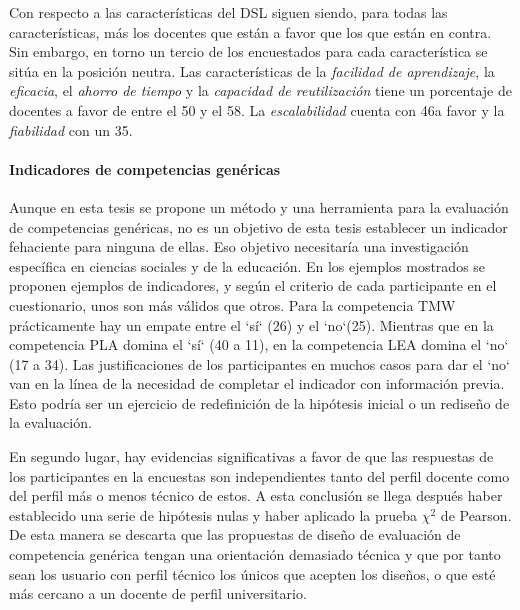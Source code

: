 Con respecto a las características del DSL siguen siendo, para todas las características, más los docentes que están a favor que los que están en contra. Sin embargo, en torno un tercio de los encuestados para cada característica se sitúa en la posición neutra. Las características de la \emph{facilidad de aprendizaje}, la \emph{eficacia}, el \emph{ahorro de tiempo} y la \emph{capacidad de reutilización} tiene un porcentaje de docentes a favor de entre el 50 y el 58\percentage. La \emph{escalabilidad} cuenta con 46\percentage{ }a favor y la \emph{fiabilidad} con un 35\percentage. 

\paragraph*{Indicadores de competencias genéricas}
Aunque en esta tesis se propone un método y una herramienta para la evaluación de competencias genéricas, no es un objetivo de esta tesis establecer un indicador fehaciente para ninguna de ellas. Eso objetivo necesitaría una investigación específica en ciencias sociales y de la educación. En los ejemplos mostrados se proponen ejemplos de indicadores, y según el criterio de cada participante en el cuestionario, unos son más válidos que otros. Para la competencia TMW prácticamente hay un empate entre el `sí` (26) y el `no`(25). Mientras que en la competencia PLA domina el `sí` (40 a 11), en la competencia LEA domina el `no` (17 a 34). Las justificaciones de los participantes en muchos casos para dar el `no` van en la línea de la necesidad de completar el indicador con información previa. Esto podría ser un ejercicio de redefinición de la hipótesis inicial o un rediseño de la evaluación.


En segundo lugar, hay evidencias significativas a favor de que las respuestas de los participantes en la encuestas son independientes tanto del perfil docente como del perfil más o menos técnico de estos. A esta conclusión se llega después haber establecido una serie de hipótesis nulas y haber aplicado la prueba $\chi^2$ de Pearson. De esta manera se descarta que las propuestas de diseño de evaluación de competencia genérica tengan una orientación demasiado técnica y que por tanto sean los usuario con perfil técnico los únicos que acepten los diseños, o que esté más cercano a un docente de perfil universitario. 

